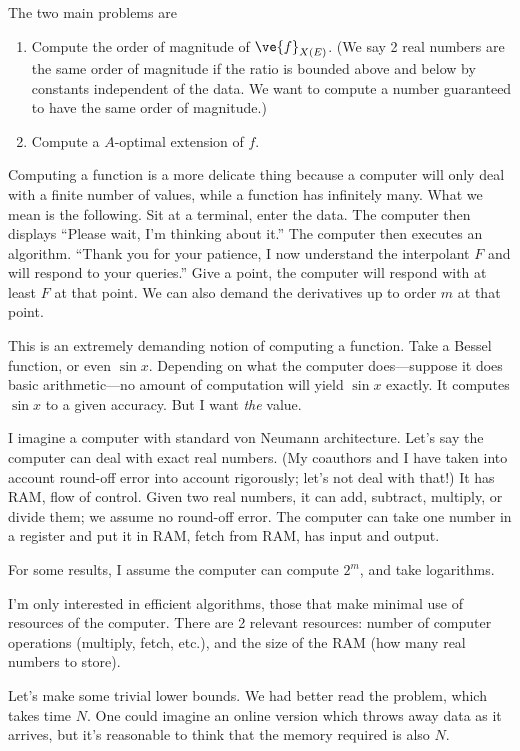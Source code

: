 The two main problems are
\begin{enumerate}
\item
Compute the order of magnitude of $\ve{f}_{X(E)}$. 
(We say 2 real numbers are the same order of magnitude if the ratio is bounded above and below by constants independent of the data. We want to compute a number guaranteed to have the same order of magnitude.)
\item
Compute a $A$-optimal extension of $f$. 
\end{enumerate}
Computing a function is a more delicate thing because a computer will only deal with a finite number of values, while a function has infinitely many. What we mean is the following. Sit at a terminal, enter the data. The computer then displays ``Please wait, I'm thinking about it.'' The computer then executes an algorithm. ``Thank you for your patience, I now understand the interpolant $F$ and will respond to your queries.'' Give a point, the computer will respond with at least $F$ at that point. We can also demand the derivatives up to order $m$ at that point.

This is an extremely demanding notion of computing a function. Take a Bessel function, or even $\sin x$. Depending on what the computer does---suppose it does basic arithmetic---no amount of computation will yield $\sin x$ exactly. It computes $\sin x$ to a given accuracy. But I want \emph{the} value.

I imagine a computer with standard von Neumann architecture. Let's say the computer can deal with exact real numbers. (My coauthors and I have taken into account round-off error into account rigorously; let's not deal with that!)
It has RAM, flow of control. Given two real numbers, it can add, subtract, multiply, or divide them; we assume no round-off error. The computer can take one number in a register and put it in RAM, fetch from RAM, has input and output.

For some results, I assume the computer can compute $2^m$, and take logarithms. 

I'm only interested in efficient algorithms, those that make minimal use of resources of the computer. There are 2 relevant resources: number of computer operations (multiply, fetch, etc.), and the size of the RAM (how many real numbers to store).

Let's make some trivial lower bounds. We had better read the problem, which takes time $N$. One could imagine an online version which throws away data as it arrives, but it's reasonable to think that the memory required is also $N$.

